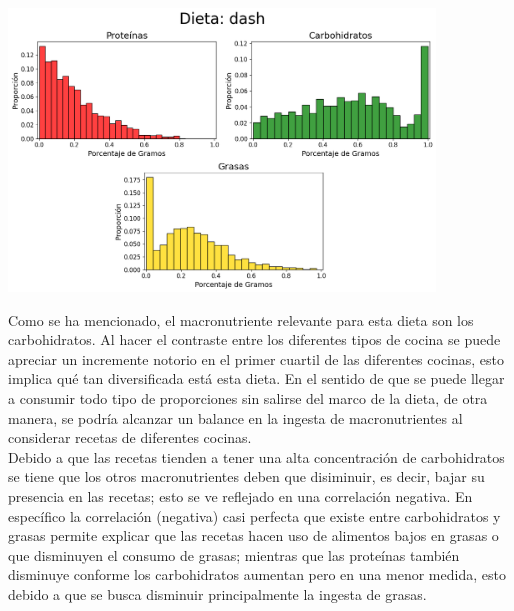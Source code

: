 \documentclass[12pt,a4paper]{article}
\begin{document}
            \begin{center}
                \includegraphics[width=0.85\textwidth]{Resources/2_03_plot_01.png}
            \end{center}

            Como se ha mencionado, el macronutriente relevante para esta dieta son los 
            carbohidratos. Al hacer el contraste entre los diferentes tipos de cocina se 
            puede apreciar un incremente notorio en el primer cuartil de las diferentes 
            cocinas, esto implica qué tan diversificada está esta dieta. En el sentido 
            de que se puede llegar a consumir todo tipo de proporciones sin salirse del 
            marco de la dieta, de otra manera, se podría alcanzar un balance en la ingesta 
            de macronutrientes al considerar recetas de diferentes cocinas.\\

            Debido a que las recetas tienden a tener una alta concentración de carbohidratos 
            se tiene que los otros macronutrientes deben que disiminuir, es decir, bajar 
            su presencia en las recetas; esto se ve reflejado en una correlación negativa. En 
            específico la correlación (negativa) casi perfecta que existe entre carbohidratos y 
            grasas permite explicar que las recetas hacen uso de alimentos bajos en grasas o que 
            disminuyen el consumo de grasas; mientras que las proteínas también disminuye conforme 
            los carbohidratos aumentan pero en una menor medida, esto debido a que se busca disminuir 
            principalmente la ingesta de grasas.
\end{document}
